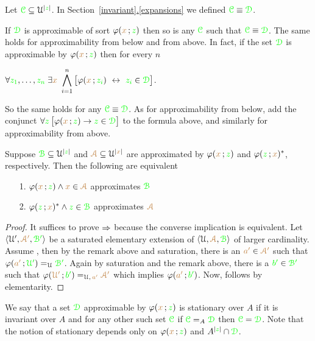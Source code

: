 \documentclass[creche.tex]{subfiles}
\begin{document}
Let ${\color{green}\EuScript C}\subseteq\EuScript U^{|{\color{green} z}|}$. In Section~\hyperref[expansions]{\ref{invariant}.\ref{expansions}} we defined  ${\color{green}\EuScript C}\equiv{\color{green}\EuScript D}$.

\begin{remark}\label{prop_approx_el_eq}
If ${\color{green}\EuScript D}$ is approximable of sort $\varphi({\color{brown} x}\,;{\color{green} z})$ then so is any ${\color{green}\EuScript C}$ such that ${\color{green}\EuScript C}\equiv{\color{green}\EuScript D}$. The same holds for approximability from below and from above. In fact, if the set ${\color{green}\EuScript D}$ is approximable by $\varphi({\color{brown} x}\,;{\color{green} z})$ then for every $n$

\hfil$\displaystyle\A {\gr z_1},\dots,{\gr z_n}\;\E {\mr x}\ \bigwedge^n_{i=1}\big[\phi({\mr x}\,;{\gr z_i})\ \iff\ {\gr z_i}\in{\gr \D}\big]$. 

So the same holds for any ${\color{green}\EuScript C}\equiv{\color{green}\EuScript D}$. As for approximability from below, add the conjunct $\forall {\color{green}z}\,\big[\varphi({\color{brown} x}\,;{\color{green} z})\rightarrow {\color{green}z}\in{\color{green}\EuScript D}\big]$ to the formula above, and similarly for approximability from above.\QED
\end{remark}


\begin{lemma}\label{lem_harrington}
Suppose ${\color{green}{\EuScript B}}\subseteq\EuScript U^{|{\color{green} z}|}$ and ${\color{brown}{\EuScript A}}\subseteq\EuScript U^{|{\color{brown} x}|}$ are approximated by $\varphi({\color{brown} x}\,;{\color{green} z})$ and  $\varphi({\color{green} z}\,;{\color{brown} x})^*$, respectively. Then the following are equivalent
\begin{itemize}
\item[1.] $\varphi({\color{brown} x}\,;{\color{green} z})\wedge{\color{brown}x}\in{{\color{brown}{\EuScript A}}}$ approximates ${\color{green}{\EuScript B}}$
\item[2.] $\varphi({\color{green} z}\,;{\color{brown} x})^*\wedge{\color{green}z}\in{{\color{green}{\EuScript B}}}$ approximates ${\color{brown}{\EuScript A}}$ 
\end{itemize}
\end{lemma}
\begin{proof}
\def\mrsA{{\mr\Aa'}}
\def\grsB{{\gr\B'}}
It suffices to prove $\Rightarrow$ because the converse implication is equivalent. Let $\<\U',\mrsA,\grsB\>$ be a saturated  elementary extension of  $\langle\EuScript U,{\color{brown}{\EuScript A}},{\color{green}{\EuScript B}}\rangle$ of larger cardinality.  Assume , then by the remark above and saturation, there is an ${\mr a'}\in\mrsA$ such that $\phi({\mr a'}\,;{\gr\U'})=_{\U}\grsB$. Again by saturation and the remark above, there is a ${\gr b'}\in\grsB$ such that $\phi({\mr\U'}\,;{\gr b'})=_{\U,\, {\mr a'}}\mrsA$ which implies $\varphi({\color{brown} a'}\,;{\color{green} b'})$. Now,  follows by elementarity.
\end{proof}

We say that a set ${\color{green}\EuScript D}$ approximable by $\varphi({\color{brown} x}\,;{\color{green} z})$ is stationary over $A$ if it is invariant over $A$ and for any other such set ${\color{green}\EuScript C}$ if ${\color{green}\EuScript C}=_A{\color{green}\EuScript D}$ then  ${\color{green}\EuScript C}={\color{green}\EuScript D}$. Note that the notion of stationary depends only on $\varphi({\color{brown} x}\,;{\color{green} z})$ and $A^{|{\color{green} z}|}\cap{\color{green}\EuScript D}$. 
\end{document}

